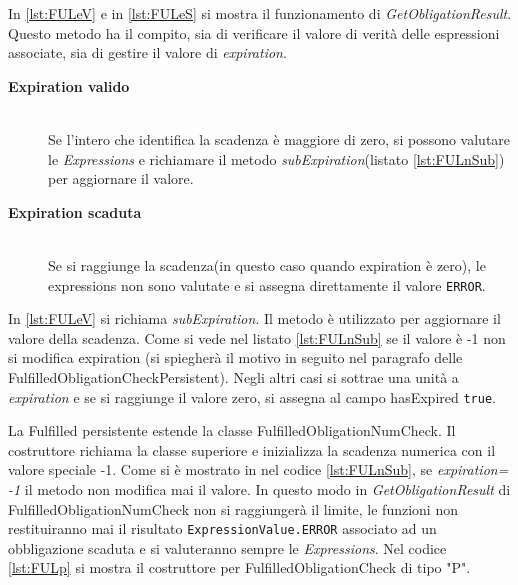 In \ref{lst:FULeV} e in \ref{lst:FULeS} si mostra il funzionamento di \emph{GetObligationResult}.
Questo metodo ha il compito, sia di verificare il valore di
verità delle espressioni associate, sia di gestire il valore di \emph{expiration}.
\begin{description}
  \item[\normalfont\bfseries{\MakeUppercase{E}xpiration valido}]
  {
  \hfill \\
  Se l'intero che identifica la scadenza è maggiore di zero,
  si possono valutare le \emph{Expressions} e richiamare il metodo \emph{subExpiration}(listato \ref{lst:FULnSub})
  per aggiornare il valore.
  }
  \item[\normalfont\bfseries{\MakeUppercase{E}xpiration scaduta}]
  {
  \hfill \\
  Se si raggiunge la scadenza(in questo caso quando expiration è zero), le expressions non sono valutate
  e si assegna direttamente il valore \texttt{ERROR}.
  }
\end{description}
In \ref{lst:FULeV} si richiama \emph{subExpiration}. Il metodo è utilizzato per aggiornare il
valore della scadenza. Come si vede nel listato \ref{lst:FULnSub} se il valore è -1 non si modifica expiration
(si spiegherà il motivo in seguito nel paragrafo delle FulfilledObligationCheckPersistent).
Negli altri casi si sottrae una unità a \emph{expiration} e
se si raggiunge il valore zero, si assegna al campo hasExpired \texttt{true}.

La Fulfilled persistente estende la classe FulfilledObligationNumCheck.
Il costruttore richiama la classe superiore e inizializza la scadenza numerica con
il valore speciale -1. Come si è mostrato in nel codice \ref{lst:FULnSub}, se \emph{expiration= -1}
il metodo non modifica mai il valore. In questo modo in \emph{GetObligationResult} di
FulfilledObligationNumCheck non si raggiungerà
il limite, le funzioni non restituiranno mai il risultato \texttt{ExpressionValue.ERROR} associato
ad un obbligazione scaduta e si valuteranno sempre le \emph{Expressions}.
Nel codice \ref{lst:FULp} si mostra il costruttore per FulfilledObligationCheck di tipo "P".

